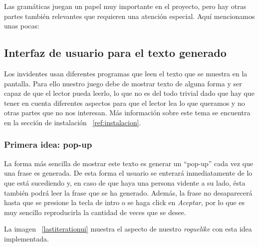 Las gramáticas juegan un papel muy importante en el proyecto, pero hay otras partes también relevantes que requieren una atención especial. Aquí mencionamos unas pocas:

\subsection{Interfaz de usuario para el texto generado}

Los invidentes usan diferentes programas que leen el texto que se muestra en la pantalla. Para ello nuestro juego debe de mostrar texto de alguna forma y ser capaz de que el lector pueda leerlo, lo que no es del todo trivial dado que hay que tener en cuenta diferentes aspectos para que el lector lea lo que queramos y no otras partes que no nos interesan. Más información sobre este tema se encuentra en la sección de instalación ~\ref{ref:instalacion}.

\subsubsection{Primera idea: pop-up}

La forma más sencilla de mostrar este texto es generar un ``pop-up'' cada vez que una frase es generada. De esta forma el usuario se enterará inmediatamente de lo que está sucediendo y, en caso de que haya una persona vidente a su lado, ésta también podrá leer la frase que se ha generado. Además, la frase no desaparecerá hasta que se presione la tecla de intro o se haga click en \textit{Aceptar}, por lo que es muy sencillo reproducirla la cantidad de veces que se desee.

La imagen ~\ref{lastiterationui} muestra el aspecto de nuestro \textit{roguelike} con esta idea implementada.

